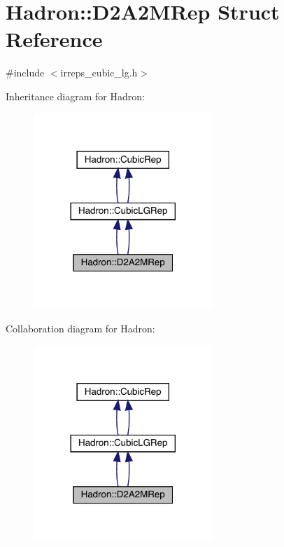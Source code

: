 \hypertarget{structHadron_1_1D2A2MRep}{}\section{Hadron\+:\+:D2\+A2\+M\+Rep Struct Reference}
\label{structHadron_1_1D2A2MRep}


{\ttfamily \#include $<$irreps\+\_\+cubic\+\_\+lg.\+h$>$}



Inheritance diagram for Hadron\+:\nopagebreak
\begin{figure}[H]
\begin{center}
\leavevmode
\includegraphics[width=192pt]{df/d3f/structHadron_1_1D2A2MRep__inherit__graph}
\end{center}
\end{figure}


Collaboration diagram for Hadron\+:\nopagebreak
\begin{figure}[H]
\begin{center}
\leavevmode
\includegraphics[width=192pt]{dd/dad/structHadron_1_1D2A2MRep__coll__graph}
\end{center}
\end{figure}
